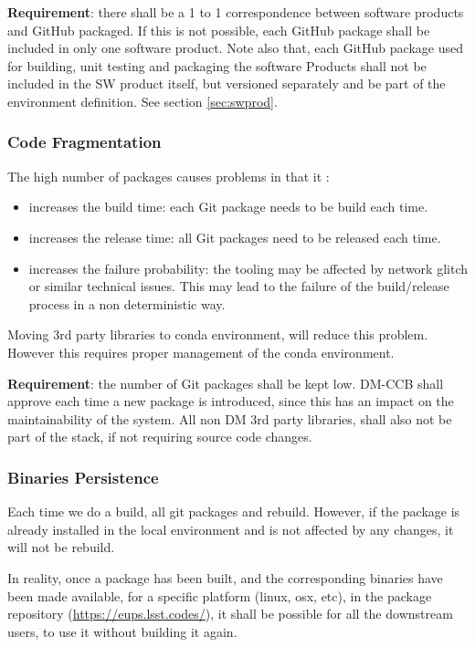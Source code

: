 \textbf{Requirement}: there shall be a 1 to 1 correspondence between software products and GitHub packaged. If this is not possible, each GitHub package shall be included in only one software product.
Note also that, each GitHub package used for building, unit testing and packaging the software Products shall not be included in the SW product itself, but versioned separately and be part of the environment definition. See section \ref{sec:swprod}.


\subsubsection{Code Fragmentation} \label{sec:problemCode}

The high number of packages causes problems in that it :

\begin{itemize}
\item increases the build time: each Git package needs to be build each time.
\item increases the release time: all Git packages need to be released each time.
\item increases the failure probability: the tooling may be affected by network glitch or similar technical issues. This may lead to the failure of the build/release process in a non deterministic way.
\end{itemize}

Moving 3rd party libraries to conda environment, will reduce this problem. 
However this requires proper management of the conda environment.

\textbf{Requirement}: the number of Git packages shall be kept low. DM-CCB shall approve each time a new package is introduced, since this has an impact on the maintainability of the system. 
All non DM 3rd party libraries, shall also not be part of the stack, if not requiring source code changes.


\subsubsection{Binaries Persistence} \label{sec:problemPersistence}

Each time we do a build, all git packages and rebuild. However, if the package is already installed in the local environment and is not affected by any changes, it will not be rebuild.

In reality, once a package has been built, and the corresponding binaries have been made available, for a specific platform (linux, osx, etc), in the package repository (\url{https://eups.lsst.codes/}),
it shall be possible for all the downstream users, to use it without building it again.

